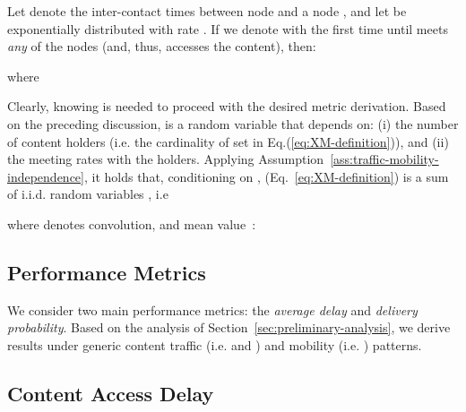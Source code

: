 \documentclass[journal]{IEEEtran}
\newcommand{\eq}[1]{Eq.~\eqref{#1}}
\begin{document}
Let  denote the inter-contact times between node  and a node , and let   be exponentially distributed with rate . If we denote with  the first time until  meets \textit{any} of the nodes  (and, thus, accesses the content), then: 

where


Clearly, knowing  is needed to proceed with the desired metric derivation. Based on the preceding discussion,  is a random variable that depends on: (i) the number of content holders  (i.e. the cardinality of set  in Eq.(\ref{eq:XM-definition})), and (ii) the meeting rates with the holders. Applying Assumption~\ref{ass:traffic-mobility-independence}, it holds that, conditioning on ,  (\eq{eq:XM-definition}) is a sum of  i.i.d. random variables , i.e

where  denotes convolution, and mean value~\cite{RossProbModels}:






\subsection{Performance Metrics}\label{sec:performance-metrics}

We consider two main performance metrics: the \textit{average delay} and \textit{delivery probability}. Based on the analysis of Section~\ref{sec:preliminary-analysis}, we derive results under generic content traffic (i.e.  and ) and mobility (i.e. ) patterns.



\subsection*{\textbf{Content Access Delay}}
\end{document}
